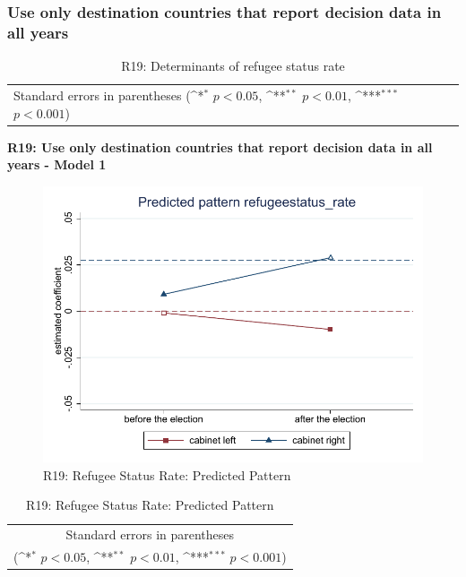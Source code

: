 \documentclass[10pt,a4paper]{scrartcl}
\begin{document}


\clearpage
\FloatBarrier
\subsubsection{Use only destination countries that report decision data in all years}
\begin{table}[!ht]\centering
	\renewcommand{\arraystretch}{1.25}
	\small
	\def\sym#1{\ifmmode^{#1}\else\(^{#1}\)\fi}
	\caption{R19: Determinants of refugee status rate}
	\begin{tabular}{l*{3}{c}}
		\hline\hline
		
		\hline\hline
		\multicolumn{4}{l}{\footnotesize Standard errors in parentheses (\sym{*} \(p<0.05\), \sym{**} \(p<0.01\), \sym{***} \(p<0.001\))}\\
	\end{tabular}
\end{table}

\clearpage
\textbf{R19: Use only destination countries that report decision data in all years - Model 1}
\begin{figure}[!ht]
	\centering
	\includegraphics[width=1\textwidth]{figures_edited/refugeestatus_rate_graph1_R19.pdf}
	\caption{R19: Refugee Status Rate: Predicted Pattern}
\end{figure}

\begin{table}[!ht]\centering
	\renewcommand{\arraystretch}{1.25}
	\def\sym#1{\ifmmode^{#1}\else\(^{#1}\)\fi}
	\caption{R19: Refugee Status Rate: Predicted Pattern}
	\begin{tabular}{l*{2}{c}}
		\hline\hline
		
		\hline\hline
		\multicolumn{3}{c}{\footnotesize Standard errors in parentheses} \\
		\multicolumn{3}{c}{\footnotesize (\sym{*} \(p<0.05\), \sym{**} \(p<0.01\), \sym{***} \(p<0.001\))}\\
	\end{tabular}
\end{table}
\end{document}
